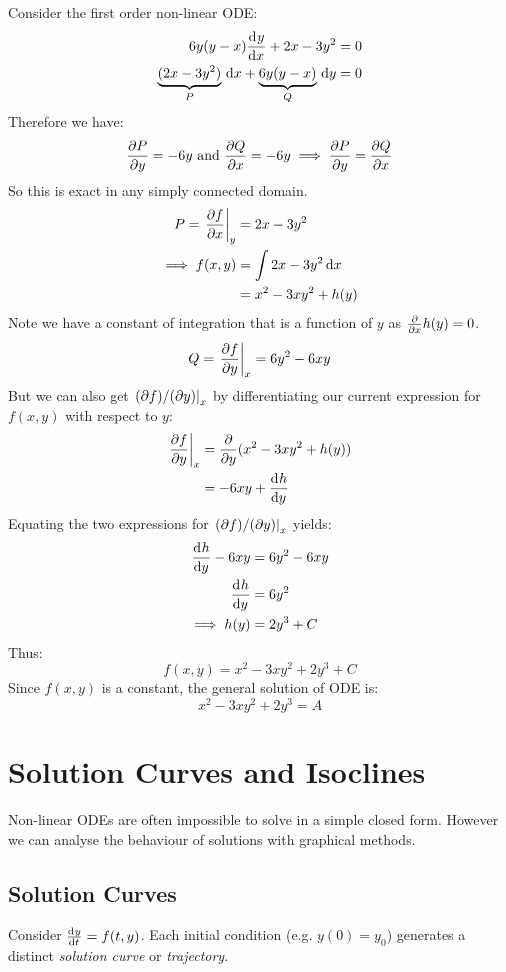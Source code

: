 \documentclass[../main.tex]{subfiles}
\begin{document}
\begin{example}
  Consider the first order non-linear ODE:
  \begin{align*}
    6y(y-x)\deriv{y}{x} + 2x - 3y^2 &= 0 \\
    \underbrace{(2x - 3y^2)}_{P}\d{x} + \underbrace{6y(y - x)}_{Q}\d{y} &= 0
  \end{align*}
  Therefore we have:
  \[
    \pderiv{P}{y} = -6y \text{ and } \pderiv{Q}{x} = -6y \implies \pderiv{P}{y} = \pderiv{Q}{x}
  \]
  So this is exact in any simply connected domain.
  \begin{align*}
    P = \at{\pderiv{f}{x}}{y} &= 2x - 3y^2 \\
    \implies f(x, y) &= \int 2x - 3y^2 \d{x} \\
                     &= x^2 - 3xy^2 + h(y)
  \end{align*}
  Note we have a constant of integration that is a function of $y$ as $\pderiv{}{x}h(y) = 0$.
  \[
    Q = \at{\pderiv{f}{y}}{x} = 6y^2 - 6xy
  \]
  But we can also get $\left. (\partial f)/(\partial y) \right|_{x}$ by differentiating our current expression for $f(x, y)$ with respect to $y$:
  \begin{align*}
    \at{\pderiv{f}{y}}{x} &= \pderiv{}{y}(x^2 - 3xy^2 + h(y)) \\
                          &= -6xy + \deriv{h}{y}\\
  \end{align*}
  Equating the two expressions for $\left. (\partial f)/(\partial y) \right|_{x}$ yields:
  \begin{align*}
    \deriv{h}{y} - 6xy &= 6y^2 - 6xy \\
    \deriv{h}{y} &= 6y^2 \\
    \implies h(y) &= 2y^3 + C
  \end{align*}
  Thus:
  \[
    f(x, y) = x^2 - 3xy^2 + 2y^3 + C
  \]
  Since $f(x, y)$ is a constant, the general solution of ODE is:
  \[
    x^2 - 3xy^2 + 2y^3 = A
  \]
\end{example}
\section{Solution Curves and Isoclines}
Non-linear ODEs are often impossible to solve in a simple closed form.
However we can analyse the behaviour of solutions with graphical methods.
\subsection{Solution Curves}
Consider $\deriv{y}{t} = f(t, y)$.
Each initial condition (e.g. $y(0) = y_0$) generates a distinct \textit{solution curve} or \textit{trajectory}.
\end{document}
